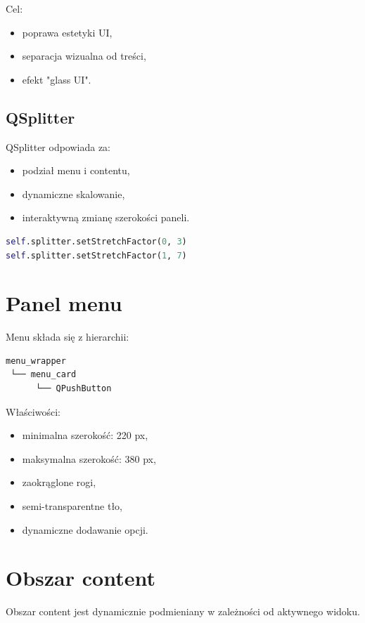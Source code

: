 \documentclass[11pt]{article}
\begin{document}
Cel:
\begin{itemize}
    \item poprawa estetyki UI,
    \item separacja wizualna od treści,
    \item efekt "glass UI".
\end{itemize}

\subsection{QSplitter}

QSplitter odpowiada za:
\begin{itemize}
    \item podział menu i contentu,
    \item dynamiczne skalowanie,
    \item interaktywną zmianę szerokości paneli.
\end{itemize}

\begin{lstlisting}[language=Python]
self.splitter.setStretchFactor(0, 3)
self.splitter.setStretchFactor(1, 7)
\end{lstlisting}

\section{Panel menu}

Menu składa się z hierarchii:

\begin{lstlisting}
menu_wrapper
 └── menu_card
      └── QPushButton
\end{lstlisting}

Właściwości:
\begin{itemize}
    \item minimalna szerokość: 220 px,
    \item maksymalna szerokość: 380 px,
    \item zaokrąglone rogi,
    \item semi-transparentne tło,
    \item dynamiczne dodawanie opcji.
\end{itemize}

\section{Obszar content}

Obszar content jest dynamicznie podmieniany w zależności od aktywnego widoku.
\end{document}
